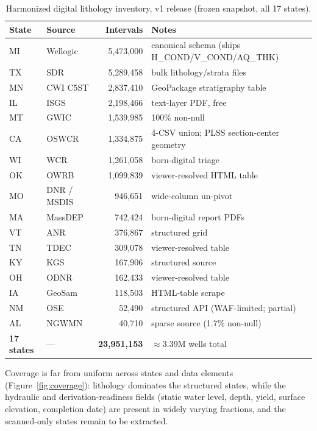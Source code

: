 \documentclass[12pt]{article}
\begin{document}
\begin{table}[t]\centering\small
\caption{Harmonized digital lithology inventory, v1 release (frozen snapshot, all 17 states).}
\label{tab:inventory}
\begin{tabularx}{\textwidth}{l l r Y}
\toprule
State & Source & Intervals & Notes \\
\midrule
MI & Wellogic & 5{,}473{,}000 & canonical schema (ships H\_COND/V\_COND/AQ\_THK) \\
TX & SDR & 5{,}289{,}458 & bulk lithology/strata files \\
MN & CWI C5ST & 2{,}837{,}410 & GeoPackage stratigraphy table \\
IL & ISGS & 2{,}198{,}466 & text-layer PDF, free \\
MT & GWIC & 1{,}539{,}985 & 100\% non-null \\
CA & OSWCR & 1{,}334{,}875 & 4-CSV union; PLSS section-center geometry \\
WI & WCR & 1{,}261{,}058 & born-digital triage \\
OK & OWRB & 1{,}099{,}839 & viewer-resolved HTML table \\
MO & DNR / MSDIS & 946{,}651 & wide-column un-pivot \\
MA & MassDEP & 742{,}424 & born-digital report PDFs \\
VT & ANR & 376{,}867 & structured grid \\
TN & TDEC & 309{,}078 & viewer-resolved table \\
KY & KGS & 167{,}906 & structured source \\
OH & ODNR & 162{,}433 & viewer-resolved table \\
IA & GeoSam & 118{,}503 & HTML-table scrape \\
NM & OSE & 52{,}490 & structured API (WAF-limited; partial) \\
AL & NGWMN & 40{,}710 & sparse source (1.7\% non-null) \\
\midrule
\textbf{17 states} & --- & \textbf{23{,}951{,}153} & $\approx$3.39M wells total \\
\bottomrule
\end{tabularx}
\end{table}

Coverage is far from uniform across states and data elements (Figure~\ref{fig:coverage}): lithology
dominates the structured states, while the hydraulic and derivation-readiness fields (static water level,
depth, yield, surface elevation, completion date) are present in widely varying fractions, and the
scanned-only states remain to be extracted.
\end{document}
